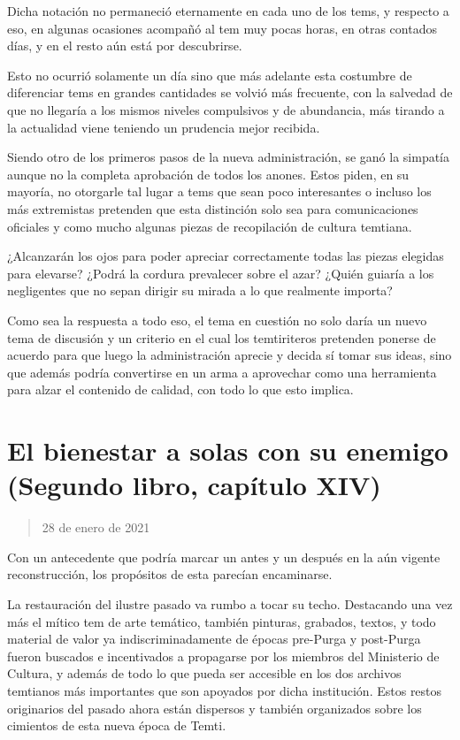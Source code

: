 \documentclass[
  spanish,
]{book}
\begin{document}
Dicha notación no permaneció eternamente en cada uno de los tems, y respecto a eso, en algunas ocasiones acompañó al tem muy pocas horas, en otras contados días, y en el resto aún está por descubrirse.

Esto no ocurrió solamente un día sino que más adelante esta costumbre de diferenciar tems en grandes cantidades se volvió más frecuente, con la salvedad de que no llegaría a los mismos niveles compulsivos y de abundancia, más tirando a la actualidad viene teniendo un prudencia mejor recibida.

Siendo otro de los primeros pasos de la nueva administración, se ganó la simpatía aunque no la completa aprobación de todos los anones. Estos piden, en su mayoría, no otorgarle tal lugar a tems que sean poco interesantes o incluso los más extremistas pretenden que esta distinción solo sea para comunicaciones oficiales y como mucho algunas piezas de recopilación de cultura temtiana.

¿Alcanzarán los ojos para poder apreciar correctamente todas las piezas elegidas para elevarse? ¿Podrá la cordura prevalecer sobre el azar? ¿Quién guiaría a los negligentes que no sepan dirigir su mirada a lo que realmente importa?

Como sea la respuesta a todo eso, el tema en cuestión no solo daría un nuevo tema de discusión y un criterio en el cual los temtiriteros pretenden ponerse de acuerdo para que luego la administración aprecie y decida sí tomar sus ideas, sino que además podría convertirse en un arma a aprovechar como una herramienta para alzar el contenido de calidad, con todo lo que esto implica.

\hypertarget{el-bienestar-a-solas-con-su-enemigo-segundo-libro-capuxedtulo-xiv}{%
\section{El bienestar a solas con su enemigo (Segundo libro, capítulo XIV)}\label{el-bienestar-a-solas-con-su-enemigo-segundo-libro-capuxedtulo-xiv}}

\begin{quote}
28 de enero de 2021
\end{quote}

Con un antecedente que podría marcar un antes y un después en la aún vigente reconstrucción, los propósitos de esta parecían encaminarse.

La restauración del ilustre pasado va rumbo a tocar su techo. Destacando una vez más el mítico tem de arte temático, también pinturas, grabados, textos, y todo material de valor ya indiscriminadamente de épocas pre-Purga y post-Purga fueron buscados e incentivados a propagarse por los miembros del Ministerio de Cultura, y además de todo lo que pueda ser accesible en los dos archivos temtianos más importantes que son apoyados por dicha institución. Estos restos originarios del pasado ahora están dispersos y también organizados sobre los cimientos de esta nueva época de Temti.
\end{document}
